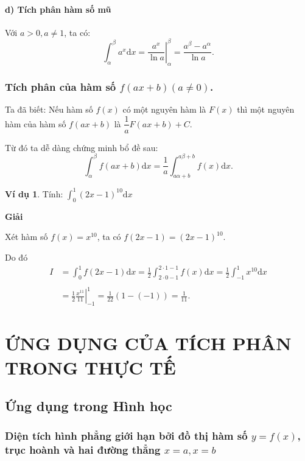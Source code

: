 \documentclass[12pt,a4paper,oneside]{book}
\theoremstyle{theorem}
\theoremstyle{definition}
\newtheorem{vd}[theorem2]{Ví dụ}
\begin{document}
\subsubsection{d) Tích phân hàm số mũ}
Với $a > 0, a \neq 1$, ta có:
\[
\int_\alpha^\beta a^x \mathrm{d}x = \left. \frac{a^x}{\ln a} \right|_\alpha^\beta = \frac{a^\beta - a^\alpha}{\ln a}.
\]

\subsection{Tích phân của hàm số $f(ax + b) (a \neq 0)$.}
Ta đã biết: Nếu hàm số $f(x)$ có một nguyên hàm là $F(x)$ thì một nguyên hàm của hàm số $f(ax + b)$ là $\dfrac{1}{a} F(ax + b) + C$.

\noindent Từ đó ta dễ dàng chứng minh bổ đề sau:
\[
\displaystyle\int_\alpha^\beta f(ax + b) \mathrm{d}x = \frac{1}{a} \int_{a\alpha + b}^{a\beta + b} f(x) \mathrm{d}x.\]

\begin{vd}
    Tính: $\displaystyle\int_0^1 (2x - 1)^{10} \mathrm{d}x$
\begin{center}
\textbf{Giải}
\end{center}
\noindent Xét hàm số $f(x) = x^{10}$, ta có $f(2x - 1) = (2x - 1)^{10}$.
\vspace{0.2cm}

\noindent Do đó \begin{align*} I &= \displaystyle\int_0^1 f(2x - 1) \mathrm{d}x = \frac{1}{2} \int_{2 \cdot 0 - 1}^{2 \cdot 1 - 1} f(x) \mathrm{d}x = \frac{1}{2} \int_{-1}^1 x^{10} \mathrm{d}x\\\\ 
&=\frac{1}{2} \left. \frac{x^{11}}{11} \right|_{-1}^1= \frac{1}{22} (1 - (-1)) = \frac{1}{11}.
\end{align*}
\end{vd} 
\chapter{ỨNG DỤNG CỦA TÍCH PHÂN TRONG THỰC TẾ}
\section{Ứng dụng trong Hình học}
\subsection{Diện tích hình phẳng giới hạn bởi đồ thị hàm số $y = f(x)$, trục hoành và hai đường thẳng $x = a, x = b$}
\end{document}
